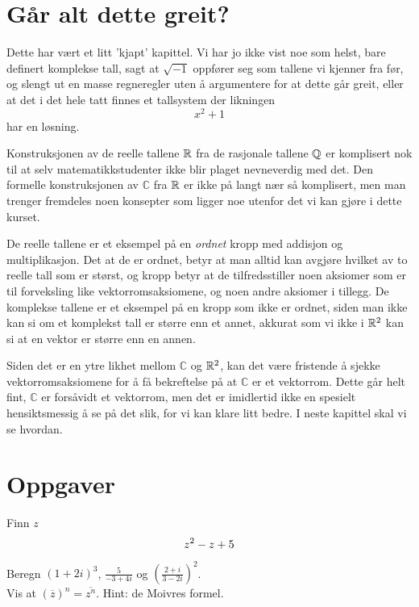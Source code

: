 \section*{Går alt dette greit?}
Dette har vært et litt 'kjapt' kapittel. Vi har jo ikke vist noe som helst, bare definert komplekse tall, sagt at $\sqrt{-1}$ oppfører seg som tallene vi kjenner fra før, og slengt ut en masse regneregler uten å argumentere for at dette går greit, eller at det i det hele tatt finnes et tallsystem der likningen
\[
x^2+1
\]
har en løsning. 

Konstruksjonen av de reelle tallene $\mathbb{R}$ fra de rasjonale tallene $\mathbb{Q}$ er komplisert nok til at selv matematikkstudenter ikke blir plaget nevneverdig med det. Den formelle konstruksjonen av $\mathbb C$ fra $\mathbb{R}$ er ikke på langt nær så komplisert, men man trenger fremdeles noen konsepter som ligger noe utenfor det vi kan gjøre i dette kurset.

De reelle tallene er et eksempel på en \emph{ordnet} kropp med addisjon og multiplikasjon. Det at de er ordnet, betyr at man alltid kan avgjøre hvilket av to reelle tall som er størst, og kropp betyr at de tilfredsstiller noen aksiomer som er til forveksling like vektorromsaksiomene, og noen andre aksiomer i tillegg. De komplekse tallene er et eksempel på en kropp som ikke er ordnet, siden man ikke kan si om et komplekst tall er større enn et annet, akkurat som vi ikke i $\mathbb{R}^2$ kan si at en vektor er større enn en annen.

Siden det er en ytre likhet mellom $\mathbb C$ og $\mathbb{R}^2$, kan det være fristende å sjekke vektorromsaksiomene for å få bekreftelse på at $\mathbb C$ er et vektorrom. Dette går helt fint, $\mathbb C$ er forsåvidt et vektorrom, men det er imidlertid ikke en spesielt hensiktsmessig å se på det slik, for vi kan klare litt bedre. I neste kapittel skal vi se hvordan.

\section*{Oppgaver}

Finn $z$
\[
z^2-z+5 \\
\]

\noindent Beregn $(1+2i)^3$, $\frac{5}{-3+4i}$ og $\left(\frac{2+i}{3-2i}\right)^2$. \\

\noindent Vis at $(\overline z)^n=\overline{z^n}$. Hint: de Moivres formel. \\
\kapittelslutt
